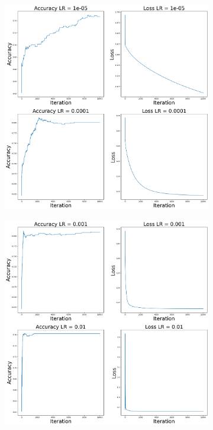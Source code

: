 \documentclass{article}
\begin{document}
\begin{figure}[h]
  \centering
  \begin{subfigure}{0.3\linewidth}
    \centering
    \includegraphics[width=\linewidth]{images/learning_rates_1.png}
    \label{fig:image1}
  \end{subfigure}
  \begin{subfigure}{0.3\linewidth}
    \centering
    \includegraphics[width=\linewidth]{images/learning_rates_2.png}

\end{subfigure}
\end{figure}
\end{document}
